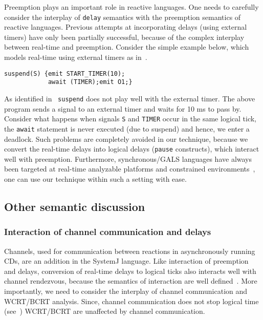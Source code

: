 Preemption plays an important role in reactive languages. One needs to
carefully consider the interplay of \texttt{delay} semantics with the
preemption semantics of reactive languages. Previous attempts at
incorporating delays (using external timers) have only been partially
successful, because of the complex interplay between real-time and
preemption. Consider the simple example below, which models real-time
using external timers as in~\cite{rsh94}. 

\begin{verbatim}
suspend(S) {emit START_TIMER(10); 
            await (TIMER);emit O1;}
\end{verbatim}

As identified in~\cite{Bourke2009a} \texttt{suspend} does not play well
with the external timer. The above program sends a signal to an external
timer and waits for 10 ms to pass by. Consider what happens when signals
\texttt{S} and \texttt{TIMER} occur in the same logical tick, the
\texttt{await} statement is never executed (due to suspend) and hence,
we enter a deadlock. Such problems are completely avoided in our
technique, because we convert the real-time delays into logical delays
(\texttt{pause} constructs), which interact well with preemption.
Furthermore, synchronous/GALS languages have always been targeted at
real-time analyzable platforms and constrained
environments~\cite{DBLP:journals/pieee/SifakisTY03,boldt07}, one can use
our technique within such a setting with ease.

\subsection{Other semantic discussion}
\label{sec:other-semant-dissc}

\subsubsection{Interaction of channel communication and delays}
\label{sec:inter-chann-comm}

Channels, used for communication between reactions in asynchronously
running CDs, are an addition in the SystemJ language. Like interaction
of preemption and delays, conversion of real-time delays to logical
ticks also interacts well with channel rendezvous, because the semantics
of interaction are well defined~\cite{amal10}. More importantly, we need
to consider the interplay of channel communication and WCRT/BCRT
analysis. Since, channel communication does not stop logical time
(see~\cite{amal10}) WCRT/BCRT are unaffected by channel
communication. %

